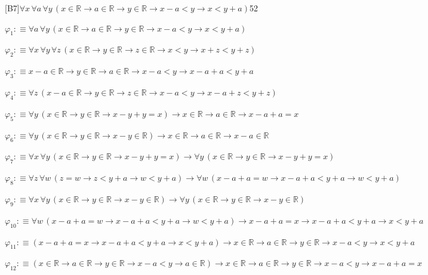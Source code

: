 \begin{fullproof}{[B7]}{$\forall x\,\forall a\,\forall y\,(x \in \mathbb{R} \to a \in \mathbb{R} \to y \in \mathbb{R} \to x - a < y \to x < y + a)$}{52}
\begin{ptree}
\end{ptree}
\begin{abbrevlist}
\item $\varphi_{1} :\equiv \forall a\,\forall y\,(x \in \mathbb{R} \to a \in \mathbb{R} \to y \in \mathbb{R} \to x - a < y \to x < y + a)$
\item $\varphi_{2} :\equiv \forall x\,\forall y\,\forall z\,(x \in \mathbb{R} \to y \in \mathbb{R} \to z \in \mathbb{R} \to x < y \to x + z < y + z)$
\item $\varphi_{3} :\equiv x - a \in \mathbb{R} \to y \in \mathbb{R} \to a \in \mathbb{R} \to x - a < y \to x - a + a < y + a$
\item $\varphi_{4} :\equiv \forall z\,(x - a \in \mathbb{R} \to y \in \mathbb{R} \to z \in \mathbb{R} \to x - a < y \to x - a + z < y + z)$
\item $\varphi_{5} :\equiv \forall y\,(x \in \mathbb{R} \to y \in \mathbb{R} \to x - y + y = x) \to x \in \mathbb{R} \to a \in \mathbb{R} \to x - a + a = x$
\item $\varphi_{6} :\equiv \forall y\,(x \in \mathbb{R} \to y \in \mathbb{R} \to x - y \in \mathbb{R}) \to x \in \mathbb{R} \to a \in \mathbb{R} \to x - a \in \mathbb{R}$
\item $\varphi_{7} :\equiv \forall x\,\forall y\,(x \in \mathbb{R} \to y \in \mathbb{R} \to x - y + y = x) \to \forall y\,(x \in \mathbb{R} \to y \in \mathbb{R} \to x - y + y = x)$
\item $\varphi_{8} :\equiv \forall z\,\forall w\,(z = w \to z < y + a \to w < y + a) \to \forall w\,(x - a + a = w \to x - a + a < y + a \to w < y + a)$
\item $\varphi_{9} :\equiv \forall x\,\forall y\,(x \in \mathbb{R} \to y \in \mathbb{R} \to x - y \in \mathbb{R}) \to \forall y\,(x \in \mathbb{R} \to y \in \mathbb{R} \to x - y \in \mathbb{R})$
\item $\varphi_{10} :\equiv \forall w\,(x - a + a = w \to x - a + a < y + a \to w < y + a) \to x - a + a = x \to x - a + a < y + a \to x < y + a$
\item $\varphi_{11} :\equiv (x - a + a = x \to x - a + a < y + a \to x < y + a) \to x \in \mathbb{R} \to a \in \mathbb{R} \to y \in \mathbb{R} \to x - a < y \to x < y + a$
\item $\varphi_{12} :\equiv (x \in \mathbb{R} \to a \in \mathbb{R} \to y \in \mathbb{R} \to x - a < y \to a \in \mathbb{R}) \to x \in \mathbb{R} \to a \in \mathbb{R} \to y \in \mathbb{R} \to x - a < y \to x - a + a = x$

\end{abbrevlist}
\end{fullproof}
